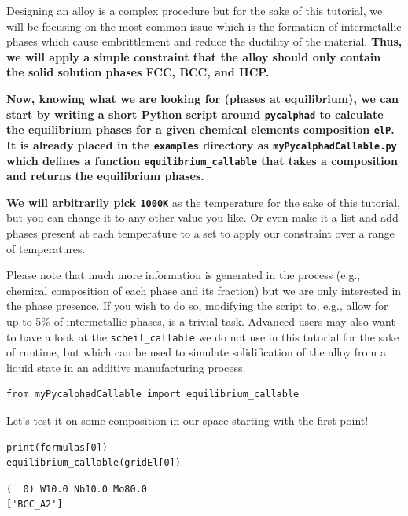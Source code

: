 Designing an alloy is a complex procedure but for the sake of this
tutorial, we will be focusing on the most common issue which is the
formation of intermetallic phases which cause embrittlement and reduce
the ductility of the material. \textbf{Thus, we will apply a simple
constraint that the alloy should only contain the solid solution phases
FCC, BCC, and HCP.}

\textbf{Now, knowing what we are looking for (phases at equilibrium), we
can start by writing a short Python script around
\texttt{pycalphad} to calculate the equilibrium phases
for a given chemical elements composition \texttt{elP}.
It is already placed in the \texttt{examples} directory
as \texttt{myPycalphadCallable.py} which defines a
function \texttt{equilibrium\_callable} that takes a
composition and returns the equilibrium phases.}

\textbf{We will arbitrarily pick \texttt{1000K}} as the
temperature for the sake of this tutorial, but you can change it to any
other value you like. Or even make it a list and add phases present at
each temperature to a set to apply our constraint over a range of
temperatures.

Please note that much more information is generated in the process
(e.g., chemical composition of each phase and its fraction) but we are
only interested in the phase presence. If you wish to do so, modifying
the script to, e.g., allow for up to 5\% of intermetallic phases, is a
trivial task. Advanced users may also want to have a look at the
\texttt{scheil\_callable} we do not use in this
tutorial for the sake of runtime, but which can be used to simulate
solidification of the alloy from a liquid state in an additive
manufacturing process.

\begin{verbatim}
from myPycalphadCallable import equilibrium_callable
\end{verbatim}

Let's test it on some composition in our space starting with the first
point!

\begin{verbatim}
print(formulas[0])
equilibrium_callable(gridEl[0])
\end{verbatim}

\begin{verbatim}
(  0) W10.0 Nb10.0 Mo80.0 
['BCC_A2']
\end{verbatim}

